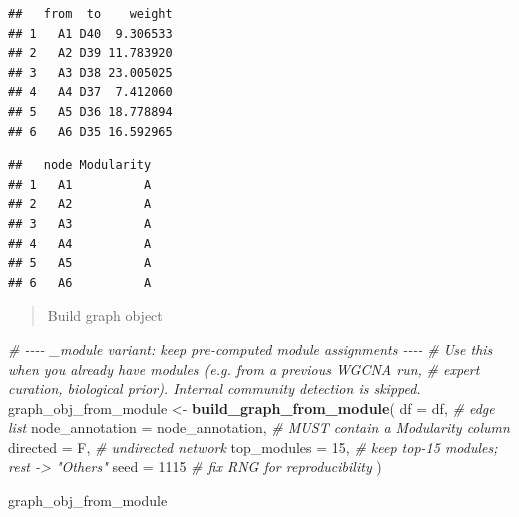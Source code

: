 \documentclass[
]{book}
\newenvironment{Shaded}{\begin{snugshade}}{\end{snugshade}}
\newcommand{\AlertTok}[1]{\textcolor[rgb]{0.94,0.16,0.16}{#1}}
\newcommand{\AttributeTok}[1]{\textcolor[rgb]{0.13,0.29,0.53}{#1}}
\newcommand{\CommentTok}[1]{\textcolor[rgb]{0.56,0.35,0.01}{\textit{#1}}}
\newcommand{\DecValTok}[1]{\textcolor[rgb]{0.00,0.00,0.81}{#1}}
\newcommand{\FunctionTok}[1]{\textcolor[rgb]{0.13,0.29,0.53}{\textbf{#1}}}
\newcommand{\NormalTok}[1]{#1}
\newcommand{\OtherTok}[1]{\textcolor[rgb]{0.56,0.35,0.01}{#1}}
\newcommand{\SpecialCharTok}[1]{\textcolor[rgb]{0.81,0.36,0.00}{\textbf{#1}}}
\begin{document}
\begin{verbatim}
##   from  to    weight
## 1   A1 D40  9.306533
## 2   A2 D39 11.783920
## 3   A3 D38 23.005025
## 4   A4 D37  7.412060
## 5   A5 D36 18.778894
## 6   A6 D35 16.592965
\end{verbatim}

\begin{Shaded}
\end{Shaded}

\begin{verbatim}
##   node Modularity
## 1   A1          A
## 2   A2          A
## 3   A3          A
## 4   A4          A
## 5   A5          A
## 6   A6          A
\end{verbatim}

\begin{quote}
Build graph object
\end{quote}

\begin{Shaded}
\begin{Highlighting}[]
\CommentTok{\# {-}{-}{-}{-} \textasciigrave{}\_module\textasciigrave{} variant: keep pre{-}computed module assignments {-}{-}{-}{-}}
\CommentTok{\# Use this when you already have modules (e.g. from a previous WGCNA run,}
\CommentTok{\# expert curation, biological prior). Internal community detection is skipped.}
\NormalTok{graph\_obj\_from\_module }\OtherTok{\textless{}{-}} \FunctionTok{build\_graph\_from\_module}\NormalTok{(}
  \AttributeTok{df              =}\NormalTok{ df,                }\CommentTok{\# edge list}
  \AttributeTok{node\_annotation =}\NormalTok{ node\_annotation,   }\CommentTok{\# MUST contain a \textasciigrave{}Modularity\textasciigrave{} column}
  \AttributeTok{directed        =}\NormalTok{ F,                 }\CommentTok{\# undirected network}
  \AttributeTok{top\_modules     =} \DecValTok{15}\NormalTok{,                }\CommentTok{\# keep top{-}15 modules; rest {-}\textgreater{} "Others"}
  \AttributeTok{seed            =} \DecValTok{1115}               \CommentTok{\# fix RNG for reproducibility}
\NormalTok{)}

\NormalTok{graph\_obj\_from\_module}
\end{Highlighting}
\end{Shaded}
\end{document}
